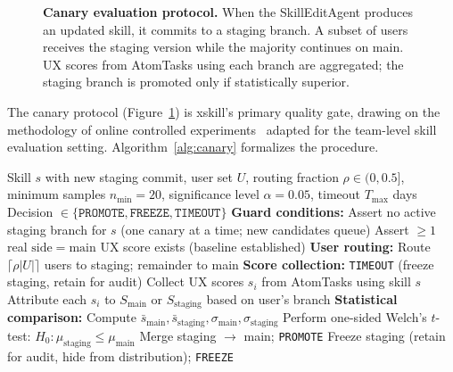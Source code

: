 \documentclass[11pt]{article}
\begin{document}
\begin{figure}[t]
\caption{\textbf{Canary evaluation protocol.} When the SkillEditAgent produces an updated skill, it commits to a staging branch. A subset of users receives the staging version while the majority continues on main. UX scores from AtomTasks using each branch are aggregated; the staging branch is promoted only if statistically superior.}
\label{fig:canary}
\end{figure}

The canary protocol (Figure~\ref{fig:canary}) is xskill's primary quality gate, drawing on the methodology of online controlled experiments~\citep{kohavi2013online, kohavi2020trustworthy} adapted for the team-level skill evaluation setting. Algorithm~\ref{alg:canary} formalizes the procedure.

\begin{algorithm}[t]
\caption{Canary Evaluation Protocol}
\label{alg:canary}
\begin{algorithmic}[1]
\REQUIRE Skill $s$ with new staging commit, user set $U$, routing fraction $\rho \in (0, 0.5]$, minimum samples $n_{\min} = 20$, significance level $\alpha = 0.05$, timeout $T_{\max}$ days
\ENSURE Decision $\in \{\texttt{PROMOTE}, \texttt{FREEZE}, \texttt{TIMEOUT}\}$
\STATE \textbf{Guard conditions:}
\STATE \quad Assert no active staging branch for $s$ (one canary at a time; new candidates queue)
\STATE \quad Assert $\geq 1$ real $\mathrm{side}=\mathrm{main}$ UX score exists (baseline established)
\STATE
\STATE \textbf{User routing:}
\STATE Route $\lceil \rho |U| \rceil$ users to staging; remainder to main
\STATE
\STATE \textbf{Score collection:}
        \RETURN \texttt{TIMEOUT} (freeze staging, retain for audit)
    \ENDIF
    \STATE Collect UX scores $s_i$ from AtomTasks using skill $s$
    \STATE Attribute each $s_i$ to $S_{\mathrm{main}}$ or $S_{\mathrm{staging}}$ based on user's branch
\ENDWHILE
\STATE
\STATE \textbf{Statistical comparison:}
\STATE Compute $\bar{s}_{\mathrm{main}}, \bar{s}_{\mathrm{staging}}, \sigma_{\mathrm{main}}, \sigma_{\mathrm{staging}}$
\STATE Perform one-sided Welch's $t$-test: $H_0\!: \mu_{\mathrm{staging}} \leq \mu_{\mathrm{main}}$
    \STATE Merge staging $\to$ main; \RETURN \texttt{PROMOTE}
\ELSE
    \STATE Freeze staging (retain for audit, hide from distribution); \RETURN \texttt{FREEZE}
\ENDIF
\end{algorithmic}
\end{algorithm}
\end{document}
